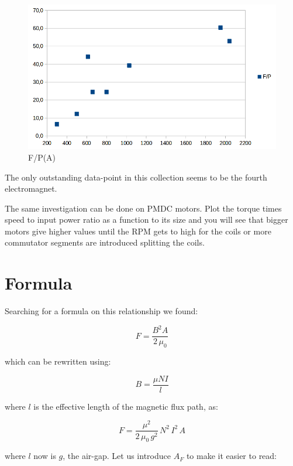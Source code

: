 \documentclass[]{../common/elementary-physics}
\begin{document}
\begin{figure}[ht] \centering
	\includegraphics[scale=.4]{fp-of-a-2} \caption{F/P(A)}
\end{figure}

The only outstanding data-point in this collection seems to be the fourth electromagnet.

The same investigation can be done on PMDC motors.
Plot the torque times speed to input power ratio as a function to its size and you will see that bigger motors give higher values until the RPM gets to high for the coils or more commutator segments are introduced splitting the coils.

\section{Formula}

Searching for a formula on this relationship we found\cite{wpele,gbet}:

\begin{equation}
F = \frac{B^2 A}{2 \, \mu_0}
\end{equation}

which can be rewritten using:

\begin{equation}
B = \frac{\mu N I}{l}
\end{equation}

where $l$ is the effective length of the magnetic flux path, as\cite{wpele}:

\begin{equation}
F = \frac{\mu^2}{2 \, \mu_0 \, g^2} \, N^2 \, I^2 \, A
\end{equation}

where $l$ now is $g$, the air-gap.
Let us introduce $A_F$ to make it easier to read:
\end{document}
